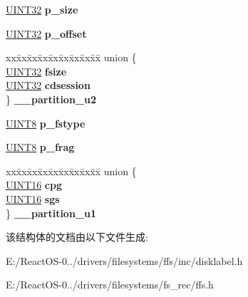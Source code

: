 \begin{DoxyCompactItemize}
\begin{tabbing}
\end{tabbing}\item 
\mbox{\label{structdisklabel_1_1partition_ac8235b1c0f37cf2c88ae4fbc95661f19}} 
\hyperlink{_processor_bind_8h_ae1e6edbbc26d6fbc71a90190d0266018}{U\+I\+N\+T32} {\bfseries p\+\_\+size}
\item 
\mbox{\label{structdisklabel_1_1partition_acd68fb890857c7a9aedd1dd6f8e59fe6}} 
\hyperlink{_processor_bind_8h_ae1e6edbbc26d6fbc71a90190d0266018}{U\+I\+N\+T32} {\bfseries p\+\_\+offset}
\item 
\mbox{\label{structdisklabel_1_1partition_aed8d696ede39d5df943041b5ac7563b3}} 
\begin{tabbing}
xx\=xx\=xx\=xx\=xx\=xx\=xx\=xx\=xx\=\kill
union \{\\
\>\hyperlink{_processor_bind_8h_ae1e6edbbc26d6fbc71a90190d0266018}{UINT32} {\bfseries fsize}\\
\>\hyperlink{_processor_bind_8h_ae1e6edbbc26d6fbc71a90190d0266018}{UINT32} {\bfseries cdsession}\\
\} {\bfseries \_\_partition\_u2}\\

\end{tabbing}\item 
\mbox{\label{structdisklabel_1_1partition_a7b1badd34a1fd5285cb6655fd75c4228}} 
\hyperlink{_processor_bind_8h_ab27e9918b538ce9d8ca692479b375b6a}{U\+I\+N\+T8} {\bfseries p\+\_\+fstype}
\item 
\mbox{\label{structdisklabel_1_1partition_a545389f02253ef0258d8cf346f023877}} 
\hyperlink{_processor_bind_8h_ab27e9918b538ce9d8ca692479b375b6a}{U\+I\+N\+T8} {\bfseries p\+\_\+frag}
\item 
\mbox{\label{structdisklabel_1_1partition_a1c40be5c727c5f39249e361ba441cf85}} 
\begin{tabbing}
xx\=xx\=xx\=xx\=xx\=xx\=xx\=xx\=xx\=\kill
union \{\\
\>\hyperlink{_processor_bind_8h_a09f1a1fb2293e33483cc8d44aefb1eb1}{UINT16} {\bfseries cpg}\\
\>\hyperlink{_processor_bind_8h_a09f1a1fb2293e33483cc8d44aefb1eb1}{UINT16} {\bfseries sgs}\\
\} {\bfseries \_\_partition\_u1}\\

\end{tabbing}\end{DoxyCompactItemize}


该结构体的文档由以下文件生成\+:\begin{DoxyCompactItemize}
\item 
E\+:/\+React\+O\+S-\/0../drivers/filesystems/ffs/inc/disklabel.\+h\item 
E\+:/\+React\+O\+S-\/0../drivers/filesystems/fs\+\_\+rec/ffs.\+h\end{DoxyCompactItemize}
